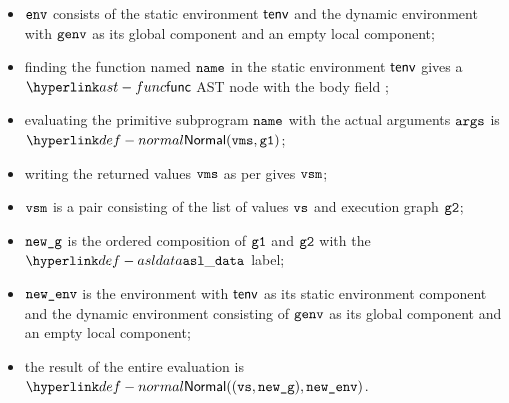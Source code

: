 \begin{mathpar}
\end{mathpar}

\ProseParagraph
\AllApply
\begin{itemize}
  \item $\env$ consists of the static environment $\tenv$ and the dynamic environment with $\genv$ as its
        global component and an empty local component;
  \item finding the function named $\name$ in the static environment $\tenv$ gives a $\func$ AST node
        with the body field \SBPrimitive;
  \item evaluating the primitive subprogram $\name$ with the actual arguments $\args$
        is $\Normal(\vms, \vgone)$\ProseOrError;
  \item writing the returned values $\vms$ as per  gives $\vvsm$;
  \item $\vvsm$ is a pair consisting of the list of values $\vvs$ and execution graph $\vgtwo$;
  \item $\newg$ is the ordered composition of $\vgone$ and $\vgtwo$ with the $\asldata$ label;
  \item $\newenv$ is the environment with $\tenv$ as its static environment component
        and the dynamic environment consisting of $\genv$ as its global component and an empty local component;
  \item the result of the entire evaluation is $\Normal((\vvs, \newg), \newenv)$.
\end{itemize}

